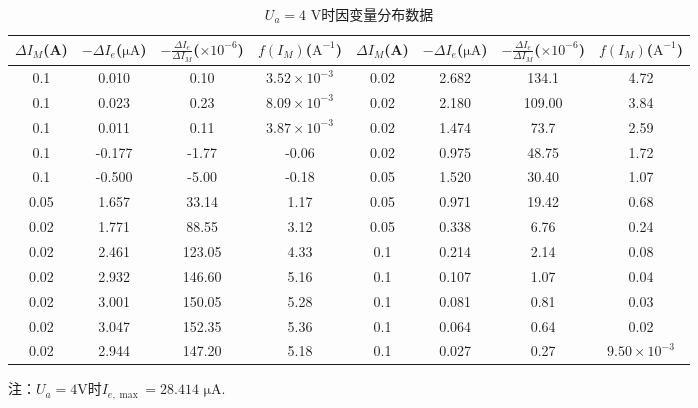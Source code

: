 \documentclass{ctexart}
\begin{document}
\begin{table}[H]
  \centering
  \caption{$U_a=4$ V时因变量分布数据}\vspace{0.3em} 
  \begin{tabular}{cccc|cccc}
  \toprule
   $\Delta I_M$(A)& $-\Delta I_e$($\mathrm{\mu A}$)& $-\frac{\Delta I_e}{\Delta I_M}$($\times 10^{-6}$)& $f(I_M)$($\mathrm{A^{-1}}$)& 
   $\Delta I_M$(A)& $-\Delta I_e$($\mathrm{\mu A}$)& $-\frac{\Delta I_e}{\Delta I_M}$($\times 10^{-6}$)& $f(I_M)$($\mathrm{A^{-1}}$)\\
  \midrule
  0.1& 0.010& 0.10& $3.52\times 10^{-3}$&         0.02& 2.682& 134.1& 4.72\\
  0.1& 0.023& 0.23& $8.09\times 10^{-3}$&         0.02& 2.180& 109.00& 3.84\\
  0.1& 0.011& 0.11& $3.87\times 10^{-3}$&         0.02& 1.474& 73.7& 2.59\\
  0.1& -0.177& -1.77& -0.06&                      0.02& 0.975& 48.75& 1.72\\
  0.1& -0.500& -5.00& -0.18&                      0.05& 1.520& 30.40& 1.07\\
  0.05& 1.657& 33.14& 1.17&                       0.05& 0.971& 19.42& 0.68\\
  0.02& 1.771& 88.55& 3.12&                       0.05& 0.338& 6.76& 0.24\\
  0.02& 2.461& 123.05& 4.33&                      0.1& 0.214& 2.14& 0.08\\
  0.02& 2.932& 146.60& 5.16&                      0.1& 0.107& 1.07& 0.04\\
  0.02& 3.001& 150.05& 5.28&                      0.1& 0.081& 0.81& 0.03\\
  0.02& 3.047& 152.35& 5.36&                      0.1& 0.064& 0.64& 0.02\\
  0.02& 2.944& 147.20& 5.18&                      0.1& 0.027& 0.27& $9.50\times 10^{-3}$\\
  \bottomrule
  \end{tabular}
  \end{table}
\noindent 注：$U_a=4$V时$I_{e,\max}=28.414$  $\mathrm{\mu A}$.
\end{document}

